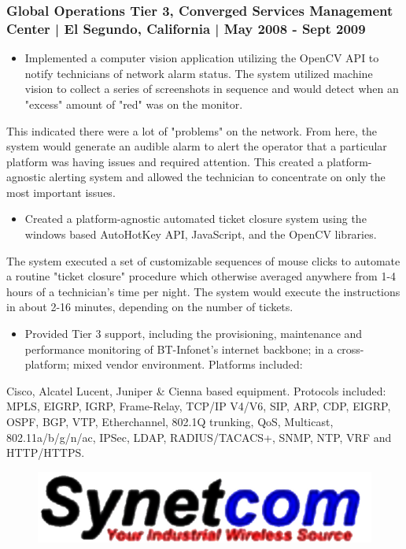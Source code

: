 \documentclass[letter,10pt]{article}
\begin{document}
\subsubsection*{Global Operations Tier 3, Converged Services Management Center | El Segundo, California | May 2008 - Sept 2009}
\label{sec:org78f7274}
\begin{itemize}
\item Implemented a computer vision application utilizing the OpenCV API to notify technicians of network alarm status. The system utilized machine vision to collect a series of screenshots in sequence and would detect when an "excess" amount of "red" was on the monitor.
\end{itemize}
This indicated there were a lot of "problems" on the network. From here, the system would generate an audible alarm to alert the operator that a particular platform was having issues and required attention. 
This created a platform-agnostic alerting system and allowed the technician to concentrate on only the most important issues. 
\begin{itemize}
\item Created a platform-agnostic automated ticket closure system using the windows based AutoHotKey API, JavaScript, and the OpenCV libraries.
\end{itemize}
The system executed a set of customizable sequences of mouse clicks to automate a routine "ticket closure" procedure which otherwise averaged anywhere from 1-4 hours of a technician's time per night. 
The system would execute the instructions in about 2-16 minutes, depending on the number of tickets. 
\begin{itemize}
\item Provided Tier 3 support, including the provisioning, maintenance and performance monitoring of BT-Infonet's internet backbone; in a cross-platform; mixed vendor environment. Platforms included:
\end{itemize}
Cisco, Alcatel Lucent, Juniper \& Cienna based equipment. Protocols included: MPLS, EIGRP, IGRP, Frame-Relay, TCP/IP V4/V6, SIP, ARP, CDP, EIGRP, OSPF, BGP, VTP, Etherchannel, 802.1Q trunking, QoS, Multicast, 802.11a/b/g/n/ac, IPSec, LDAP, RADIUS/TACACS+, SNMP, NTP, VRF and HTTP/HTTPS.




\begin{figure}
\includegraphics[width=0.8\linewidth]{./img/50p_cr_synetcom.jpg}
\end{figure}
\end{document}
